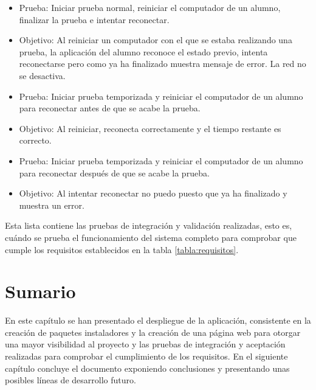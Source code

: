 \begin{itemize}
    \item Prueba: Iniciar prueba normal, reiniciar el computador de un alumno, finalizar la prueba e intentar reconectar.
    \item Objetivo: Al reiniciar un computador con el que se estaba realizando una prueba, la aplicación del alumno reconoce el estado previo, intenta reconectarse pero como ya ha finalizado muestra mensaje de error. La red no se desactiva.
    \newline


    \item Prueba: Iniciar prueba temporizada y reiniciar el computador de un alumno para reconectar antes de que se acabe la prueba.
    \item Objetivo: Al reiniciar, reconecta correctamente y el tiempo restante es correcto.
    \newline

    \item Prueba: Iniciar prueba temporizada y reiniciar el computador de un alumno para reconectar después de que se acabe la prueba.
    \item Objetivo: Al intentar reconectar no puedo puesto que ya ha finalizado y muestra un error.
    \newline

\end{itemize}


Esta lista contiene las pruebas de integración y validación realizadas, esto es, cuándo se prueba el funcionamiento del sistema completo para comprobar que cumple los requisitos establecidos en la tabla \ref{tabla:requisitos}.
\newline


\section{Sumario}

En este capítulo se han presentado el despliegue de la aplicación, consistente en la creación de paquetes instaladores y la creación de una página web para otorgar una mayor visibilidad al proyecto y las pruebas de integración y aceptación realizadas para comprobar el cumplimiento de los requisitos. En el siguiente capítulo concluye el documento exponiendo conclusiones y presentando unas posibles líneas de desarrollo futuro. 